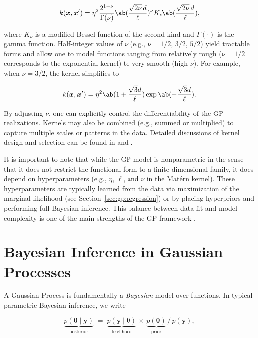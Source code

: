 \begin{equation}
    k(\bm{x},\bm{x}') = \eta^2 \frac{2^{1-\nu}}{\Gamma(\nu)}\ab(\frac{\sqrt{2\nu}\,d}{\ell})^\nu K_\nu\!\ab(\frac{\sqrt{2\nu}\,d}{\ell}),
\end{equation}

where $K_\nu$ is a modified Bessel function of the second kind and $\Gamma(\cdot)$ is the gamma function. Half-integer values of $\nu$ (e.g., $\nu = 1/2$, $3/2$, $5/2$) yield tractable forms and allow one to model functions ranging from relatively rough ($\nu=1/2$ corresponds to the exponential kernel) to very smooth (high $\nu$). For example, when $\nu=3/2$, the kernel simplifies to

\begin{align}
    k(\bm{x},\bm{x}') = \eta^2 \ab(1 + \frac{\sqrt{3} d}{\ell}) \exp \ab( -\frac{\sqrt{3} d}{\ell}).
\end{align}

 By adjusting $\nu$, one can explicitly control the differentiability of the GP realizations. Kernels may also be combined (e.g., summed or multiplied) to capture multiple scales or patterns in the data. Detailed discussions of kernel design and selection can be found in \citet[][Chapter 4]{rasmussen_gaussian_2006} and \citet{duvenaud_automatic_2014}.

It is important to note that while the GP model is nonparametric in the sense that it does not restrict the functional form to a finite-dimensional family, it does depend on hyperparameters (e.g., $\eta$, $\ell$, and $\nu$ in the Matérn kernel). These hyperparameters are typically learned from the data via maximization of the marginal likelihood (see Section~\ref{sec:gp:regression}) or by placing hyperpriors and performing full Bayesian inference. This balance between data fit and model complexity is one of the main strengths of the GP framework \cite[cf.][pp 110-111]{rasmussen_gaussian_2006}.

\section{Bayesian Inference in Gaussian Processes}\label{sec:gp:bayes}

A Gaussian Process is fundamentally a \textit{Bayesian} model over functions. In typical parametric Bayesian inference, we write

\begin{equation}\label{eq:theory:gp:bayes_rule}
    \underbrace{p(\bm{\theta} \mid \bm{y})}_{\text{posterior}}
    \;=\;
    \underbrace{p(\bm{y} \mid \bm{\theta})}_{\text{likelihood}}
    \,\times\,
    \underbrace{p(\bm{\theta})}_{\text{prior}}
    \,\bigg/\, p(\bm{y}),
\end{equation}

